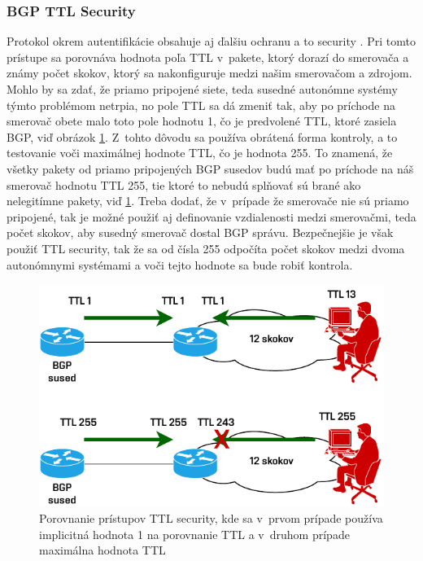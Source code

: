 \subsubsection*{BGP TTL Security}
Protokol  okrem autentifikácie obsahuje aj ďalšiu ochranu a to  security \cite{AlHFaPbj6IbKzbuv}. Pri tomto prístupe sa porovnáva hodnota poľa TTL v~pakete, ktorý dorazí do smerovača a známy počet skokov, ktorý sa nakonfiguruje medzi našim smerovačom a zdrojom. Mohlo by sa zdať, že priamo pripojené siete, teda susedné autonómne systémy týmto problémom netrpia, no pole TTL sa dá zmeniť tak, aby po príchode na smerovač obete malo toto pole hodnotu 1, čo je predvolené TTL, ktoré zasiela BGP, viď obrázok \ref{fig:ttl-sec}. Z~tohto dôvodu sa používa obrátená forma kontroly, a to testovanie voči maximálnej hodnote TTL, čo je hodnota 255. To znamená, že všetky pakety od priamo pripojených BGP susedov budú mať po príchode na náš smerovač hodnotu TTL 255, tie ktoré to nebudú splňovať sú brané ako nelegitímne pakety, viď \ref{fig:ttl-sec}. Treba dodať, že v~prípade že smerovače nie sú priamo pripojené, tak je možné použiť aj definovanie vzdialenosti medzi smerovačmi, teda počet skokov, aby susedný smerovač dostal BGP správu. Bezpečnejšie je však použiť TTL security, tak že sa od čísla 255 odpočíta počet skokov medzi dvoma autonómnymi systémami a voči tejto hodnote sa bude robiť kontrola.

\begin{figure}[H]
	\begin{center}
		\includegraphics[scale=1]{obrazky/ttl-sec.pdf}
	\end{center}
	\caption[Porovnanie prístupov TTL security]{Porovnanie prístupov TTL security, kde sa v~prvom prípade používa implicitná hodnota 1 na porovnanie TTL a v~druhom prípade maximálna hodnota TTL \cite{AlHFaPbj6IbKzbuv}}
	\label{fig:ttl-sec}
\end{figure} 


